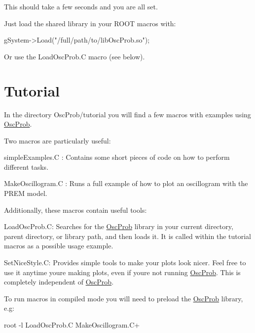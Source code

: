 This should take a few seconds and you are all set.

Just load the shared library in your R\+O\+OT macros with\+: 
\begin{DoxyCode}
gSystem->Load(\textcolor{stringliteral}{"/full/path/to/libOscProb.so"});
\end{DoxyCode}


Or use the {\ttfamily Load\+Osc\+Prob.\+C} macro (see below).

\section*{Tutorial}

In the directory Osc\+Prob/tutorial you will find a few macros with examples using \hyperlink{namespaceOscProb}{Osc\+Prob}.

Two macros are particularly useful\+:
\begin{DoxyItemize}
\item {\ttfamily simple\+Examples.\+C} \+: Contains some short pieces of code on how to perform different tasks.
\item {\ttfamily Make\+Oscillogram.\+C} \+: Runs a full example of how to plot an oscillogram with the P\+R\+EM model.
\end{DoxyItemize}

Additionally, these macros contain useful tools\+:
\begin{DoxyItemize}
\item {\ttfamily Load\+Osc\+Prob.\+C}\+: Searches for the \hyperlink{namespaceOscProb}{Osc\+Prob} library in your current directory, parent directory, or library path, and then loads it. It is called within the tutorial macros as a possible usage example.
\item {\ttfamily Set\+Nice\+Style.\+C}\+: Provides simple tools to make your plots look nicer. Feel free to use it anytime you\textquotesingle{}re making plots, even if you\textquotesingle{}re not running \hyperlink{namespaceOscProb}{Osc\+Prob}. This is completely independent of \hyperlink{namespaceOscProb}{Osc\+Prob}.
\end{DoxyItemize}

To run macros in compiled mode you will need to preload the \hyperlink{namespaceOscProb}{Osc\+Prob} library, e.\+g\+:


\begin{DoxyCode}
root -l LoadOscProb.C MakeOscillogram.C+
\end{DoxyCode}
 